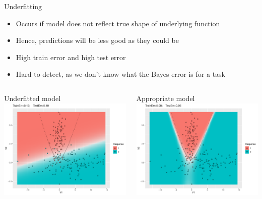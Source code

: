 \begin{vbframe}{Underfitting}

\begin{itemize}
  \item Occurs if model does not reflect true shape of underlying
      function
  \item Hence, predictions will be less good as they could be
  \item High train error and high test error
  \item Hard to detect, as we don't know what the Bayes error is for a task
\end{itemize}
\lz
\begin{columns}
\begin{column}{0.5\textwidth}
  \raggedright
  Underfitted model\\
  \includegraphics[width=\textwidth]{figure/eval_ofit_1u}
\end{column}
\begin{column}{0.5\textwidth}
  \raggedright
  Appropriate model\\
  \includegraphics[width=\textwidth]{figure/eval_ofit_1a}
\end{column}
\end{columns}
\end{vbframe}

